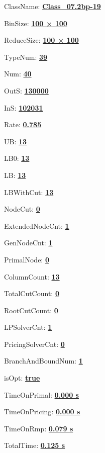 \documentclass[11pt]{article}
\begin{document}
\pagestyle{empty}


ClassName: \underline{\textbf{Class_07.2bp-19}}
\par
BinSize: \underline{\textbf{100 × 100}}
\par
ReduceSize: \underline{\textbf{100 × 100}}
\par
TypeNum: \underline{\textbf{39}}
\par
Num: \underline{\textbf{40}}
\par
OutS: \underline{\textbf{130000}}
\par
InS: \underline{\textbf{102031}}
\par
Rate: \underline{\textbf{0.785}}
\par
UB: \underline{\textbf{13}}
\par
LB0: \underline{\textbf{13}}
\par
LB: \underline{\textbf{13}}
\par
LBWithCut: \underline{\textbf{13}}
\par
NodeCut: \underline{\textbf{0}}
\par
ExtendedNodeCnt: \underline{\textbf{1}}
\par
GenNodeCnt: \underline{\textbf{1}}
\par
PrimalNode: \underline{\textbf{0}}
\par
ColumnCount: \underline{\textbf{13}}
\par
TotalCutCount: \underline{\textbf{0}}
\par
RootCutCount: \underline{\textbf{0}}
\par
LPSolverCnt: \underline{\textbf{1}}
\par
PricingSolverCnt: \underline{\textbf{0}}
\par
BranchAndBoundNum: \underline{\textbf{1}}
\par
isOpt: \underline{\textbf{true}}
\par
TimeOnPrimal: \underline{\textbf{0.000 s}}
\par
TimeOnPricing: \underline{\textbf{0.000 s}}
\par
TimeOnRmp: \underline{\textbf{0.079 s}}
\par
TotalTime: \underline{\textbf{0.125 s}}
\par
\newpage


\end{document}
